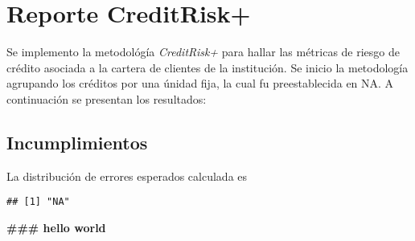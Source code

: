 \documentclass[]{article}
\title{}
\author{}
\date{}
\begin{document}
\section{Reporte CreditRisk+}\label{reporte-creditrisk}

Se implemento la metodológía \emph{CreditRisk+} para hallar las métricas
de riesgo de crédito asociada a la cartera de clientes de la
institución. Se inicio la metodología agrupando los créditos por una
únidad fija, la cual fu preestablecida en NA. A continuación se
presentan los resultados:

\subsection{Incumplimientos}\label{incumplimientos}

La distribución de errores esperados calculada es

\begin{verbatim}
## [1] "NA"
\end{verbatim}

\textbf{ \#\#\# hello world }
\end{document}
